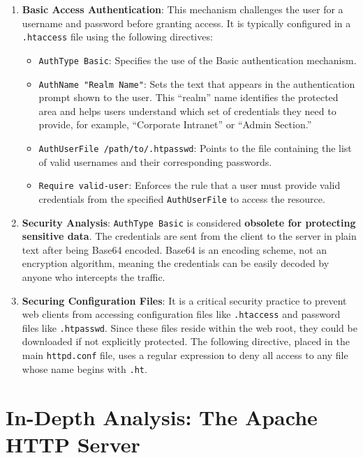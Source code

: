 \documentclass{scrbook}
\begin{document}
	\begin{enumerate}
		\item \textbf{Basic Access Authentication}: This mechanism challenges the user for a username and password before granting access. It is typically configured in a \texttt{.htaccess} file using the following directives:
		\begin{itemize}
			\item \texttt{AuthType Basic}: Specifies the use of the Basic authentication mechanism.
			
			\item \texttt{AuthName "Realm Name"}: Sets the text that appears in the authentication prompt shown to the user. This ``realm'' name identifies the protected area and helps users understand which set of credentials they need to provide, for example, ``Corporate Intranet'' or ``Admin Section.''
			
			\item \texttt{AuthUserFile /path/to/.htpasswd}: Points to the file containing the list of valid usernames and their corresponding passwords.
			
			\item \texttt{Require valid-user}: Enforces the rule that a user must provide valid credentials from the specified \texttt{AuthUserFile} to access the resource.
		\end{itemize}
		
		\item \textbf{Security Analysis}: \texttt{AuthType Basic} is considered \textbf{obsolete for protecting sensitive data}. The credentials are sent from the client to the server in plain text after being Base64 encoded. Base64 is an encoding scheme, not an encryption algorithm, meaning the credentials can be easily		decoded by anyone who intercepts the traffic.
		
		\item \textbf{Securing Configuration Files}: It is a critical security practice to prevent web clients from accessing configuration files like \texttt{.htaccess} and password files like \texttt{.htpasswd}. Since these files reside within the web root, they could be downloaded if not explicitly protected. The following directive, placed in the main \texttt{httpd.conf} file, uses a regular expression to deny all access to any file whose name begins with \texttt{.ht}.
	\end{enumerate}
	
	\chapter{In-Depth Analysis: The Apache HTTP Server}
	
\end{document}
